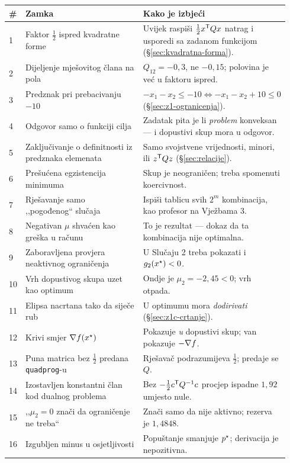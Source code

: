 \begin{longtable}{@{}p{0.05\linewidth} p{0.42\linewidth} p{0.47\linewidth}@{}}
\toprule
\textbf{\#} & \textbf{Zamka} & \textbf{Kako je izbjeći} \\
\midrule
\endhead
1 & Faktor $\tfrac12$ ispred kvadratne forme & Uvijek raspiši
$\tfrac12 x^{\mathsf{T}} Qx$ natrag i usporedi sa zadanom funkcijom (\S\ref{sec:kvadratna-forma}). \\[5pt]
2 & Dijeljenje mješovitog člana na pola & $Q_{12} = -0{,}3$, ne $-0{,}15$;
polovina je već u faktoru ispred. \\[5pt]
3 & Predznak pri prebacivanju $-10$ & $-x_1-x_2 \leq -10 \Leftrightarrow -x_1-x_2+10 \leq 0$
(\S\ref{sec:z1-ogranicenja}). \\[5pt]
4 & Odgovor samo o funkciji cilja & Zadatak pita je li \emph{problem} konveksan --- i
dopustivi skup mora u odgovor. \\[5pt]
5 & Zaključivanje o definitnosti iz predznaka elemenata & Samo svojstvene
vrijednosti, minori, ili $z^{\mathsf{T}} Qz$ (\S\ref{sec:relacije}). \\[5pt]
6 & Prešućena egzistencija minimuma & Skup je neograničen; treba spomenuti
koercivnost. \\[5pt]
7 & Rješavanje samo ,,pogođenog`` slučaja & Ispiši tablicu svih $2^m$ kombinacija,
kao profesor na Vježbama 3. \\[5pt]
8 & Negativan $\mu$ shvaćen kao greška u računu & To je rezultat --- dokaz da ta
kombinacija nije optimalna. \\[5pt]
9 & Zaboravljena provjera neaktivnog ograničenja & U Slučaju 2 treba pokazati i
$g_2(x^{\star}) < 0$. \\[5pt]
10 & Vrh dopustivog skupa uzet kao optimum & Ondje je $\mu_2 = -2{,}45 < 0$;
vrh otpada. \\[5pt]
11 & Elipsa nacrtana tako da siječe rub & U optimumu mora \emph{dodirivati}
(\S\ref{sec:z1c-crtanje}). \\[5pt]
12 & Krivi smjer $\nabla f(x^{\star})$ & Pokazuje \emph{u} dopustivi skup; van pokazuje
$-\nabla f$. \\[5pt]
13 & Puna matrica bez $\tfrac12$ predana \texttt{quadprog}-u & Rješavač
podrazumijeva $\tfrac12$; predaje se $Q$. \\[5pt]
14 & Izostavljen konstantni član kod dualnog problema & Bez
$-\tfrac12 c^{\mathsf{T}} Q^{-1}c$ procjep ispadne $1{,}92$ umjesto nule. \\[5pt]
15 & ,,$\mu_2 = 0$ znači da ograničenje ne treba`` & Znači samo da nije aktivno;
rezerva je $1{,}4848$. \\[5pt]
16 & Izgubljen minus u osjetljivosti & Popuštanje smanjuje $p^{\star}$; derivacija je
nepozitivna. \\
\bottomrule
\end{longtable}

